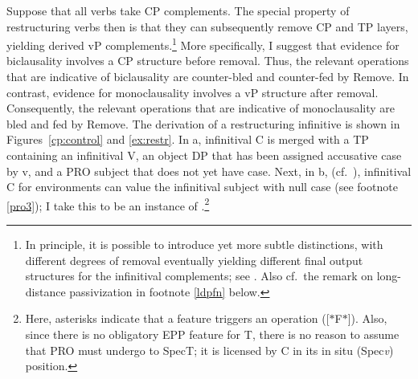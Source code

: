 \documentclass[output=paper]{langsci/langscibook}
\begin{document}
Suppose that all  verbs take CP complements.  The special property of
restructuring  verbs then is that they can subsequently remove CP and TP
layers, yielding derived vP complements.\footnote{In principle, it is possible
    to introduce yet more subtle distinctions, with different degrees of
    removal eventually yielding different final output structures for the
    infinitival complements; see \citet{Fanselow:91,Wurmbrand:01,Wurmbrand:15}.
    Also cf.\ the remark on long-distance
passivization in footnote \ref{ldpfn} below.} More specifically, I suggest that
evidence for biclausality involves a CP structure before removal. Thus, the
relevant operations that are indicative of biclausality are counter-bled and
counter-fed by Remove. In contrast, evidence for monoclausality involves a vP
structure after removal. Consequently, the relevant operations that are
indicative of monoclausality are bled and fed by Remove.  The derivation of a
restructuring  infinitive is shown in Figures~\ref{cp:control} and
\ref{ex:restr}. In a, infinitival C is merged with a TP
containing an infinitival V, an object DP that has been assigned accusative
case by v, and a PRO subject that does not yet have case. Next, in
b, (cf.\ ), infinitival C for 
environments can value the infinitival subject with null case (see footnote
\ref{pro3}); I take this to be an instance of .\footnote{Here, asterisks
    indicate that a feature triggers an  operation ([$*$F$*$]).  Also,
    since there is no obligatory \gls{EPP} feature for  T, there is no reason
    to assume that PRO must undergo  to SpecT; it is licensed by C in
its in situ (Spec\emph{v}) position.}
\end{document}
